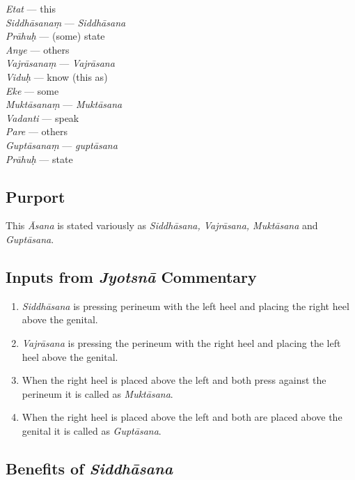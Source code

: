 \begin{multicols}{2}
\itemsep=0pt
\textit{Etat} --- this   \\
\textit{Siddhāsanaṃ} --- \textit{Siddhāsana}   \\
\textit{Prāhuḥ} --- (some) state \\
\textit{Anye} --- others   \\
\textit{Vajrāsanaṃ} --- \textit{Vajrāsana}  \\
\textit{Viduḥ} --- know (this as) \\
\textit{Eke} --- some \\
\textit{Muktāsanaṃ} --- \textit{Muktāsana}   \\
\textit{Vadanti} --- speak \\
\textit{Pare} --- others \\
\textit{Guptāsanaṃ} ---  \textit{guptāsana}  \\
\textit{Prāhuḥ} --- state  
\end{multicols}
\vspace{-10pt}

\subsection*{Purport}
\vspace{-5pt}

This \textit{Āsana} is stated variously as \textit{Siddhāsana, Vajrāsana, Muktāsana} and \textit{Guptāsana}.

\subsection*{Inputs from \textit{Jyotsnā} Commentary}

\begin{enumerate}
\itemsep=0pt
\item \textit{Siddhāsana} is pressing perineum with the left heel and placing the right heel above the genital. 
\item \textit{Vajrāsana} is pressing the perineum with the right heel and placing the left heel above the genital.
\item When the right heel is placed above the left and both press against the perineum it is called as \textit{Muktāsana}.
\item When the right heel is placed above the left and both are placed above the genital it is called as \textit{Guptāsana}.
\end{enumerate}

\subsection*{Benefits of \textit{Siddhāsana}}


